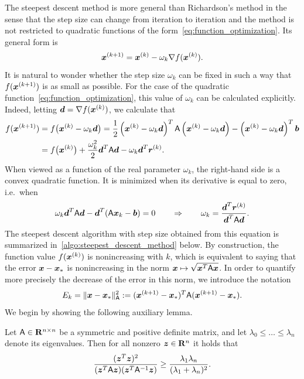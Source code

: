 The steepest descent method is more general than Richardson's method in the sense that
the step size can change from iteration to iteration
and the method is not restricted to quadratic functions of the form~\eqref{eq:function_optimization}.
Its general form is
\[
    \mathbf{\boldsymbol{x}}^{(k+1)} = \mathbf{\boldsymbol{x}}^{(k)} - \omega_k \nabla f(\mathbf{\boldsymbol{x}}^{(k)}).
\]
It is natural to wonder whether the step size $\omega_k$ can be fixed in such a way that
$f(\mathbf{\boldsymbol{x}}^{(k+1)})$ is as small as possible.
For the case of the quadratic function~\eqref{eq:function_optimization},
this value of $\omega_k$ can be calculated explicitly.
Indeed, letting $\mathbf{\boldsymbol{d}} = \nabla f(\mathbf{\boldsymbol{x}}^{(k)})$,
we calculate that
\begin{align}
    \notag
    f(\mathbf{\boldsymbol{x}}^{(k+1)})
    &= f\bigl(\mathbf{\boldsymbol{x}}^{(k)} - \omega_k \mathbf{\boldsymbol{d}}\bigr) = \frac{1}{2} \left( \mathbf{\boldsymbol{x}}^{(k)} - \omega_k \mathbf{\boldsymbol{d}}\right)^T \mathsf A \left(\mathbf{\boldsymbol{x}}^{(k)} - \omega_k \mathbf{\boldsymbol{d}}\right) - \left(\mathbf{\boldsymbol{x}}^{(k)} - \omega_k \mathbf{\boldsymbol{d}}\right)^T \mathbf{\boldsymbol{b}} \\
    \label{eq:linear_steepest}
    &= f\bigl( \mathbf{\boldsymbol{x}}^{(k)} \bigr) + \frac{\omega_k^2}{2} \mathbf{\boldsymbol{d}}^T \mathsf A \mathbf{\boldsymbol{d}} - \omega_k \mathbf{\boldsymbol{d}}^T \mathbf{\boldsymbol{r}}^{(k)}.
\end{align}
When viewed as a function of the real parameter $\omega_k$, 
the right-hand side is a convex quadratic function.
It is minimized when its derivative is equal to zero,
i.e.\ when
\begin{equation}
    \label{eq:linear_optimal_step_size_steepest_descent}
    \omega_k \mathbf{\boldsymbol{d}}^T \mathsf A \mathbf{\boldsymbol{d}} - \mathbf{\boldsymbol{d}}^T (\mathsf A \mathbf{\boldsymbol{x}}_k - \mathbf{\boldsymbol{b}}) = 0
    \qquad \Rightarrow  \qquad \omega_k = \frac{\mathbf{\boldsymbol{d}}^T \mathbf{\boldsymbol{r}}^{(k)}}{\mathbf{\boldsymbol{d}}^T \mathsf A \mathbf{\boldsymbol{d}}}.
\end{equation}
The steepest descent algorithm with step size obtained from this equation is summarized in~\cref{algo:steepest_descent_method} below.
By construction,
the function value $f(\mathbf{\boldsymbol{x}}^{(k)})$ is nonincreasing with $k$,
which is equivalent to saying that
the error $\mathbf{\boldsymbol{x}} - \mathbf{\boldsymbol{x}}_*$ is nonincreasing in the norm $\mathbf{\boldsymbol{x}} \mapsto \sqrt{\mathbf{\boldsymbol{x}}^T \mathsf A \mathbf{\boldsymbol{x}}}$.
In order to quantify more precisely the decrease of the error in this norm,
we introduce the notation
\[
    E_k = \lVert\mathbf{\boldsymbol{x}} - \mathbf{\boldsymbol{x}}_*\rVert^2_{\mathsf A} := (\mathbf{\boldsymbol{x}}^{(k+1)} - \mathbf{\boldsymbol{x}}_*)^T \mathsf A (\mathbf{\boldsymbol{x}}^{(k+1)} - \mathbf{\boldsymbol{x}}_*).
\]
We begin by showing the following auxiliary lemma.
\begin{lemma}
    Let $\mathsf A \in \mathbf R^{n \times n}$ be a symmetric and positive definite matrix,
    and let $\lambda_0 \leq \dots \leq \lambda_n$ denote its eigenvalues.
    Then for all nonzero $\mathbf{\boldsymbol{z}} \in \mathbf R^n$ it holds that
    \[
        \frac{(\mathbf{\boldsymbol{z}}^T \mathbf{\boldsymbol{z}})^2}{(\mathbf{\boldsymbol{z}}^T \mathsf A \mathbf{\boldsymbol{z}}) (\mathbf{\boldsymbol{z}}^T \mathsf A^{-1} \mathbf{\boldsymbol{z}})}
        \geq \frac{\lambda_1 \lambda_n}{(\lambda_1 + \lambda_n)^2}.
    \]
\end{lemma}
